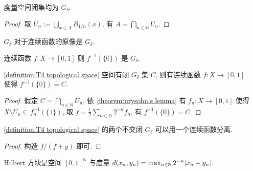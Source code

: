 \begin{lemma}
    度量空间闭集均为 \(G_\delta\).

    \begin{proof}
        取 \(U_n := \bigcup_{x \in A} B_{1/n} (x)\), 有 \(A = \bigcap_{n \in \mathbb{N}} U_n\).
    \end{proof}
\end{lemma}

\begin{lemma}
    \(G_\delta\) 对于连续函数的原像是 \(G_\delta\).
\end{lemma}

\begin{corollary}
    连续函数 \(f : X \to [0,1]\) 则 \(f^{-1} (\{0\})\) 是 \(G_\delta\).
\end{corollary}

\begin{theorem}
    \label {theorem:G-deltas in T4 topological space has continuous function to 0}
    \ref{definition:T4 topological space} 空间有闭 \(G_\delta\) 集 \(C\),
    则有连续函数 \(f : X \to [0,1]\) 使得 \(f^{-1} (\{0\}) = C\).

    \begin{proof}
        假定 \(C = \bigcap_{n \in \mathbb{N}} U_n\), 依 \ref{theorem:urysohn's lemma} 有 \(f_n : X \to [0,1]\) 使得 \(X \setminus U_n \subseteq f_n^{-1} (\{1\})\),
        取 \(f = \frac{1}{2} \sum_{n \in \mathbb{N}} 2^{-n} f_n\), 有 \(f^{-1} (\{0\}) = C\).
    \end{proof}
\end{theorem}

\begin{corollary}
    \ref{definition:T4 topological space} 的两个不交闭 \(G_\delta\) 可以用一个连续函数分离.

    \begin{proof}
        构造 \(f / (f + g)\) 即可.
    \end{proof}
\end{corollary}

\begin{definition}[Hilbert 方块]
    \label {definition:hilbert cube}
    Hilbert 方块是空间 \([0,1]^\mathbb{N}\) 与度量 \(d (x_n, y_n) = \max_{n \in \mathbb{N}} 2^{-n} \abs{x_n - y_n}\).
\end{definition}

